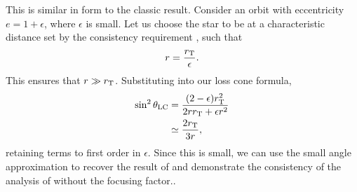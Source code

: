 This is similar in form to the classic result. Consider an orbit with eccentricity $e = 1 + \epsilon$, where $\epsilon$ is small. Let us choose the star to be at a characteristic distance set by the consistency requirement , such that
\begin{equation}
r = \dfrac{r_\mathrm{T}}{\epsilon}.
\end{equation}
This ensures that $r \gg r_\mathrm{T}$. Substituting into our loss cone formula,
\begin{align}
\sin^2\theta_\mathrm{LC} = {} & \dfrac{(2 - \epsilon)r_\mathrm{T}^2}{2rr_\mathrm{T} + \epsilon r^2} \nonumber \\
 \simeq {} & \dfrac{2r_\mathrm{T}}{3r},
\end{align}
retaining terms to first order in $\epsilon$. Since this is small, we can use the small angle approximation to recover the result of  and demonstrate the consistency of the analysis of \citet{Frank1976} without the focusing factor..
